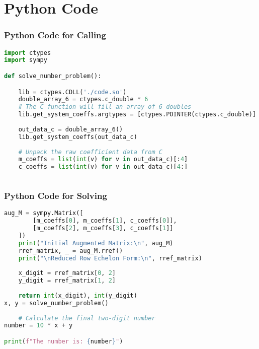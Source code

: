 \documentclass{beamer}
\theoremstyle{remark}
\numberwithin{equation}{section}
\begin{document}
\section{Python Code}
\begin{frame}[fragile]
\frametitle{Python Code for Calling}
\begin{lstlisting}[language=Python]
import ctypes
import sympy

def solve_number_problem():

    lib = ctypes.CDLL('./code.so')
    double_array_6 = ctypes.c_double * 6
    # The C function will fill an array of 6 doubles
    lib.get_system_coeffs.argtypes = [ctypes.POINTER(ctypes.c_double)]
    
    out_data_c = double_array_6()
    lib.get_system_coeffs(out_data_c)
    
    # Unpack the raw coefficient data from C
    m_coeffs = list(int(v) for v in out_data_c)[:4]
    c_coeffs = list(int(v) for v in out_data_c)[4:]
   
\end{lstlisting}
\end{frame}
\begin{frame}[fragile]
\frametitle{Python Code for Solving}
\begin{lstlisting}[language=Python]
 aug_M = sympy.Matrix([
        [m_coeffs[0], m_coeffs[1], c_coeffs[0]],
        [m_coeffs[2], m_coeffs[3], c_coeffs[1]]
    ])
    print("Initial Augmented Matrix:\n", aug_M)
    rref_matrix, _ = aug_M.rref()
    print("\nReduced Row Echelon Form:\n", rref_matrix)
    
    x_digit = rref_matrix[0, 2]
    y_digit = rref_matrix[1, 2]
    
    return int(x_digit), int(y_digit)
x, y = solve_number_problem()
    
    # Calculate the final two-digit number
number = 10 * x + y

print(f"The number is: {number}")
\end{lstlisting}
\end{frame}
 
\end{document}
